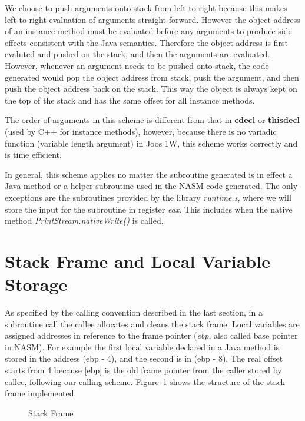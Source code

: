\documentclass[a4paper, notitlepage]{report}
\begin{document}
We choose to push arguments onto stack from left to right because this makes left-to-right evaluation of arguments straight-forward. However the object address of an instance method must be evaluated before any arguments to produce side effects consistent with the Java semantics. Therefore the object address is first evaluted and pushed on the stack, and then the arguments are evaluated. However, whenever an argument needs to be pushed onto stack, the code generated would pop the object address from stack, push the argument, and then push the object address back on the stack. This way the object is always kept on the top of the stack and has the same offset for all instance methods.

The order of arguments in this scheme is different from that in \textbf{cdecl} or \textbf{thisdecl} (used by C++ for instance methods), however, because there is no variadic function (variable length argument) in Joos 1W, this scheme works correctly and is time efficient.

In general, this scheme applies no matter the subroutine generated is in effect a Java method or a helper subroutine used in the NASM code generated. The only exceptions are the subroutines provided by the library \emph{runtime.s}, where we will store the input for the subroutine in register \emph{eax}. This includes when the native method \emph{PrintStream.nativeWrite()} is called.

\section{Stack Frame and Local Variable Storage}

As specified by the calling convention described in the last section, in a subroutine call the callee allocates and cleans the stack frame. Local variables are assigned addresses in reference to the frame pointer (\emph{ebp}, also called base pointer in NASM). For example the first local variable declared in a Java method is stored in the address (ebp - 4), and the second is in (ebp - 8). The real offset starts from 4 because [ebp] is the old frame pointer from the caller stored by callee, following our calling scheme. Figure~\ref{stack_frame} shows the structure of the stack frame implemented.

\begin{figure}
  \caption{Stack Frame}
  \label{stack_frame}
\end{figure}

\end{document}
